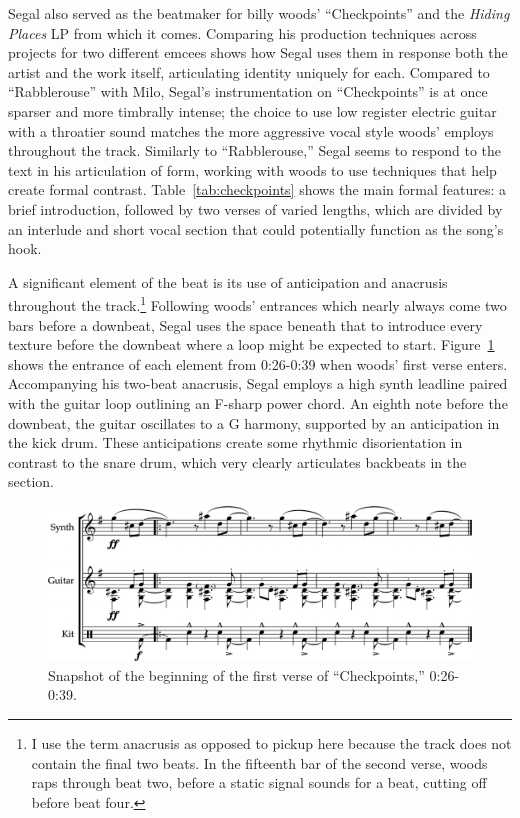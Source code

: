 Segal also served as the beatmaker for billy woods' ``Checkpoints'' and the \textit{Hiding Places} LP 
from which it comes. Comparing his production techniques across projects for two different emcees shows 
how Segal uses them in response both the artist and the work itself, articulating identity uniquely for 
each. Compared to ``Rabblerouse'' with Milo, Segal's instrumentation on ``Checkpoints'' is at once sparser
and more timbrally intense; the choice to use low register electric guitar with a throatier sound matches 
the more aggressive vocal style woods' employs throughout the track. Similarly to ``Rabblerouse,'' Segal
seems to respond to the text in his articulation of form, working with woods to use techniques that help
create formal contrast. Table~\ref{tab:checkpoints} shows the main formal features: a brief introduction,
followed by two verses of varied lengths, which are divided by an interlude and short vocal section that
could potentially function as the song's hook.

A significant element of the beat is its use of anticipation and anacrusis throughout the 
track.\footnote{I use the term anacrusis as opposed to pickup here because the track does not contain
the final two beats. In the fifteenth bar of the second verse, woods raps through beat two, before 
a static signal sounds for a beat, cutting off before beat four.} Following woods' entrances which 
nearly always come two bars before a downbeat, Segal uses the space beneath that to introduce every 
texture before the downbeat where a loop might be expected to start. Figure~\ref{fig:checkpointsintro} 
shows the entrance of each element from 0:26-0:39 when woods' first verse enters. Accompanying his 
two-beat anacrusis, Segal employs a high synth leadline paired with the guitar loop outlining an F-sharp
power chord. An eighth note before the downbeat, the guitar oscillates to a G harmony, supported by an
anticipation in the kick drum. These anticipations create some rhythmic disorientation in contrast 
to the snare drum, which very clearly articulates backbeats in the section.

    \begin{figure}[ht]
        \centering
        \includegraphics[width=\textwidth]{images/figures/chp 02/026039checkpointsintro.pdf}
        \caption{Snapshot of the beginning of the first verse of ``Checkpoints,'' 0:26-0:39.}
        \label{fig:checkpointsintro}
    \end{figure}


